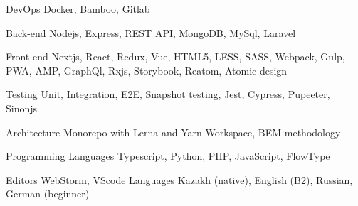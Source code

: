 

\begin{cvskills}

  \cvskill
    {DevOps} %
    {Docker, Bamboo, Gitlab} %

  \cvskill
    {Back-end} %
    {Nodejs, Express, REST API, MongoDB, MySql, Laravel} %

  \cvskill
    {Front-end} %
    {Nextjs, React, Redux, Vue, HTML5, LESS, SASS, Webpack, Gulp, PWA, AMP, GraphQl, Rxjs, Storybook, Reatom, Atomic design} %

  \cvskill
    {Testing} %
    {Unit, Integration, E2E, Snapshot testing, Jest, Cypress, Pupeeter, Sinonjs} 

  \cvskill
    {Architecture} %
      {Monorepo with Lerna and Yarn Workspace, BEM methodology} 

  \cvskill
    {Programming Languages} %
    {Typescript, Python, PHP, JavaScript, FlowType} %

  \cvskill
    {Editors} %
    {WebStorm, VScode} 
  \cvskill
    {Languages} %
    {Kazakh (native), English (B2), Russian, German (beginner)} %

\end{cvskills}
